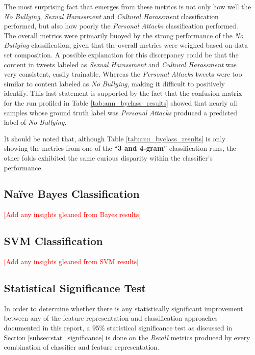 \documentclass[conference]{sig-alternate-05-2015}
\newcommand{\todo}[1]{{\textcolor{red}{[#1]}}}
\begin{document}
The most surprising fact that emerges from these metrics is not only how well
the \textit{No Bullying}, \textit{Sexual Harassment} and \textit{Cultural
Harassment} classification performed, but also how poorly the \textit{Personal
Attacks} classification performed. The overall metrics were primarily buoyed by
the strong performance of the \textit{No Bullying} classification, given that
the overall metrics were weighed based on data set composition. A possible
explanation for this discrepancy could be that the content in tweets labeled
as \textit{Sexual Harassment} and \textit{Cultural Harassment} was very
consistent, easily trainable. Whereas the \textit{Personal Attacks} tweets were
too similar to content labeled as \textit{No Bullying}, making it difficult to
positively identify. This last statement is supported by the fact that the
confusion matrix for the run profiled in Table \ref{tab:ann_byclass_results}
showed that nearly all samples whose ground truth label was \textit{Personal
Attacks} produced a predicted label of \textit{No Bullying}.\par

It should be noted that, although Table \ref{tab:ann_byclass_results} is only
showing the metrics from one of the ``\textbf{3 and 4-gram}'' classification
runs, the other folds exhibited the same curious disparity within the
classifier's performance.\par

\subsection{Na\"ive Bayes Classification}\label{subsec:bayes_discussion}

\todo{Add any insights gleaned from Bayes results}

\subsection{SVM Classification}\label{subsec:svm_discussion}

\todo{Add any insights gleaned from SVM results}

\subsection{Statistical Significance Test}\label{subsec:stat_sig_discussion}

In order to determine whether there is any statistically significant improvement
between any of the feature representation and classification approaches
documented in this report, a 95\% statistical significance test as discussed in
Section \ref{subsec:stat_significance} is done on the \textit{Recall} metrics
produced by every combination of classifier and feature representation.
\end{document}
